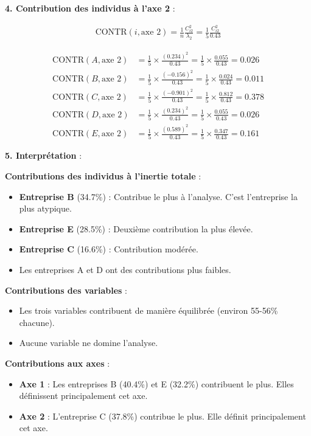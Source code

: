 \documentclass[11pt,a4paper]{article}
\begin{document}
\textbf{4. Contribution des individus à l'axe 2} :

\begin{align*}
\text{CONTR}(i, \text{axe } 2) = \frac{1}{n}\frac{C_{i2}^2}{\lambda_2} = \frac{1}{5}\frac{C_{i2}^2}{0.43}
\end{align*}

\begin{align*}
\text{CONTR}(A, \text{axe } 2) &= \frac{1}{5} \times \frac{(0.234)^2}{0.43} = \frac{1}{5} \times \frac{0.055}{0.43} = 0.026 \\
\text{CONTR}(B, \text{axe } 2) &= \frac{1}{5} \times \frac{(-0.156)^2}{0.43} = \frac{1}{5} \times \frac{0.024}{0.43} = 0.011 \\
\text{CONTR}(C, \text{axe } 2) &= \frac{1}{5} \times \frac{(-0.901)^2}{0.43} = \frac{1}{5} \times \frac{0.812}{0.43} = 0.378 \\
\text{CONTR}(D, \text{axe } 2) &= \frac{1}{5} \times \frac{(0.234)^2}{0.43} = \frac{1}{5} \times \frac{0.055}{0.43} = 0.026 \\
\text{CONTR}(E, \text{axe } 2) &= \frac{1}{5} \times \frac{(0.589)^2}{0.43} = \frac{1}{5} \times \frac{0.347}{0.43} = 0.161
\end{align*}

\textbf{5. Interprétation} :

\textbf{Contributions des individus à l'inertie totale} :
\begin{itemize}
    \item \textbf{Entreprise B} (34.7\%) : Contribue le plus à l'analyse. C'est l'entreprise la plus atypique.
    \item \textbf{Entreprise E} (28.5\%) : Deuxième contribution la plus élevée.
    \item \textbf{Entreprise C} (16.6\%) : Contribution modérée.
    \item Les entreprises A et D ont des contributions plus faibles.
\end{itemize}

\textbf{Contributions des variables} :
\begin{itemize}
    \item Les trois variables contribuent de manière équilibrée (environ 55-56\% chacune).
    \item Aucune variable ne domine l'analyse.
\end{itemize}

\textbf{Contributions aux axes} :
\begin{itemize}
    \item \textbf{Axe 1} : Les entreprises B (40.4\%) et E (32.2\%) contribuent le plus. Elles définissent principalement cet axe.
    \item \textbf{Axe 2} : L'entreprise C (37.8\%) contribue le plus. Elle définit principalement cet axe.
\end{itemize}
\end{document}
